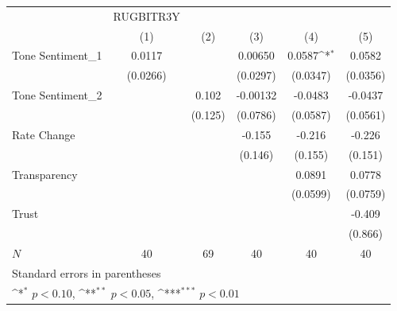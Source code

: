 {
\def\sym#1{\ifmmode^{#1}\else\(^{#1}\)\fi}
\begin{tabular}{l*{5}{c}}
\hline\hline
            &   RUGBITR3Y         &                     &                     &                     &                     \\
            &\multicolumn{1}{c}{(1)}         &\multicolumn{1}{c}{(2)}         &\multicolumn{1}{c}{(3)}         &\multicolumn{1}{c}{(4)}         &\multicolumn{1}{c}{(5)}         \\
\hline
Tone Sentiment\_{1}&      0.0117         &                     &     0.00650         &      0.0587\sym{*}  &      0.0582         \\
            &    (0.0266)         &                     &    (0.0297)         &    (0.0347)         &    (0.0356)         \\
[1em]
Tone Sentiment\_{2}&                     &       0.102         &    -0.00132         &     -0.0483         &     -0.0437         \\
            &                     &     (0.125)         &    (0.0786)         &    (0.0587)         &    (0.0561)         \\
[1em]
Rate Change &                     &                     &      -0.155         &      -0.216         &      -0.226         \\
            &                     &                     &     (0.146)         &     (0.155)         &     (0.151)         \\
[1em]
Transparency&                     &                     &                     &      0.0891         &      0.0778         \\
            &                     &                     &                     &    (0.0599)         &    (0.0759)         \\
[1em]
Trust       &                     &                     &                     &                     &      -0.409         \\
            &                     &                     &                     &                     &     (0.866)         \\
\hline
\(N\)       &          40         &          69         &          40         &          40         &          40         \\
\hline\hline
\multicolumn{6}{l}{\footnotesize Standard errors in parentheses}\\
\multicolumn{6}{l}{\footnotesize \sym{*} \(p<0.10\), \sym{**} \(p<0.05\), \sym{***} \(p<0.01\)}\\
\end{tabular}
}
